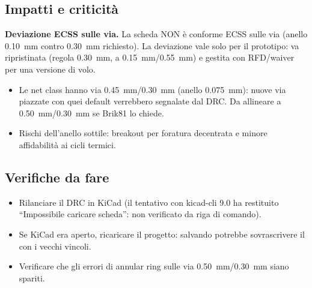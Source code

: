 \subsection{Impatti e criticit\`a}
\begin{critbox}
\textbf{Deviazione ECSS sulle via.} La scheda NON \`e conforme ECSS sulle via (anello \SI{0,10}{\milli\metre} contro \SI{0,30}{\milli\metre} richiesto). La deviazione vale solo per il prototipo: va ripristinata (regola \SI{0,30}{\milli\metre},  a \SI{0,15}{\milli\metre}/\SI{0,55}{\milli\metre}) e gestita con RFD/waiver per una versione di volo.
\end{critbox}
\begin{notebox}
\begin{itemize}
  \item Le net class hanno via \SI{0,45}{\milli\metre}/\SI{0,30}{\milli\metre} (anello \SI{0,075}{\milli\metre}): nuove via piazzate con quei default verrebbero segnalate dal DRC. Da allineare a \SI{0,50}{\milli\metre}/\SI{0,30}{\milli\metre} se Brik81 lo chiede.
  \item Rischi dell'anello sottile: breakout per foratura decentrata e minore affidabilit\`a ai cicli termici.
\end{itemize}
\end{notebox}

\subsection{Verifiche da fare}
\begin{itemize}
  \item Rilanciare il DRC in KiCad (il tentativo con kicad-cli 9.0 ha restituito ``Impossibile caricare scheda'': non verificato da riga di comando).
  \item Se KiCad era aperto, ricaricare il progetto: salvando potrebbe sovrascrivere il  con i vecchi vincoli.
  \item Verificare che gli errori di annular ring sulle via \SI{0,50}{\milli\metre}/\SI{0,30}{\milli\metre} siano spariti.
\end{itemize}
